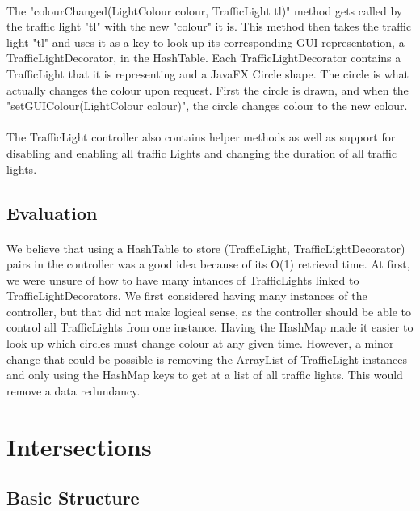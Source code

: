 \documentclass[a4paper,11pt,titlepage]{article}
\begin{document}
\paragraph{}
The "colourChanged(LightColour colour, TrafficLight tl)" method gets called by the traffic light "tl" with the new "colour" it is. This method then takes the traffic light "tl" and uses it as a key to look up its corresponding GUI representation, a TrafficLightDecorator, in the HashTable. Each TrafficLightDecorator contains a TrafficLight that it is representing and a JavaFX Circle shape. The circle is what actually changes the colour upon request. First the circle is drawn, and when the "setGUIColour(LightColour colour)", the circle changes colour to the new colour.
\paragraph{}
The TrafficLight controller also contains helper methods as well as support for disabling and enabling all traffic Lights and changing the duration of all traffic lights.

\subsection{Evaluation}
\paragraph{}
We believe that using a HashTable to store (TrafficLight, TrafficLightDecorator) pairs in the controller was a good idea because of its O(1) retrieval time. At first, we were unsure of how to have many intances of TrafficLights linked to TrafficLightDecorators. We first considered having many instances of the controller, but that did not make logical sense, as the controller should be able to control all TrafficLights from one instance. Having the HashMap made it easier to look up which circles must change colour at any given time. However, a minor change that could be possible is removing the ArrayList of TrafficLight instances and only using the HashMap keys to get at a list of all traffic lights. This would remove a data redundancy.

\section{Intersections}\label{intersectionsection}
\subsection{Basic Structure}
\end{document}
